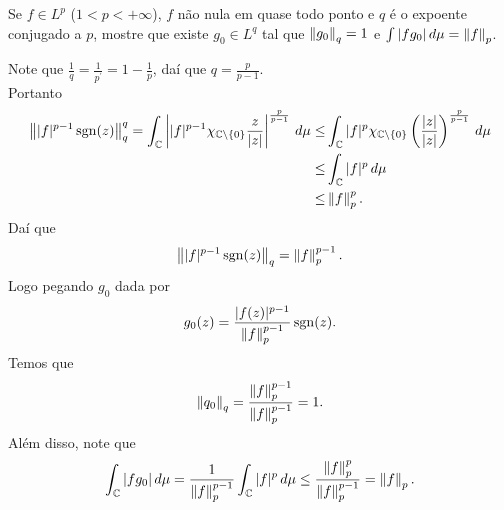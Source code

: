 \begin{homeworkProblem}[3]
  Se $f\in L^{p}$ ($1<p<+\infty$), $f$ não nula em quase todo ponto e $q$ é o expoente conjugado a $p$, mostre que existe $g_0\in L^{q}$ tal que $\left\|g_0\right\|_{q}=1$ e $\int |fg_0|\,d\mu=\left\|f\right\|_{p}$. 
  \begin{solution}
    Note que $\frac{1}{q}=\frac{1}{p^{\prime}}=1-\frac{1}{p}$, daí que $q=\frac{p}{p-1}$.\\
    Portanto
    \begin{align*}
      \left\||f|^{p-1}\operatorname*{sgn}(z)\right\|_{q}^{q}=\int_{\mathbb{C}}\left| |f|^{p-1}\chi_{\mathbb{C}\setminus\{0\}}\frac{z}{|z|} \right|^{\frac{p}{p-1}}\,d\mu\leq& \int_{\mathbb{C}}|f|^{p}\chi_{\mathbb{C}\setminus\{0\}}\left( \frac{|z|}{|z|} \right)^{\frac{p}{p-1}}\,d\mu\\
      \leq& \int_{\mathbb{C}}|f|^{p}\,d\mu\\
      \leq& \left\|f\right\|_{p}^{p}.
    \end{align*}
    Daí que
    \begin{align*}
      \left\||f|^{p-1}\operatorname*{sgn}(z)\right\|_{q}=\left\|f\right\|_p^{p-1}.
    \end{align*}
    Logo pegando $g_0$ dada por
    \begin{align*}
      g_0(z)=\frac{|f(z)|^{p-1}}{\left\|f\right\|_{p}^{p-1}}\operatorname*{sgn}(z).
    \end{align*}
    Temos que
    \begin{align*}
      \left\|q_0\right\|_q=\frac{\left\|f\right\|_{p}^{p-1}}{\left\|f\right\|_{p}^{p-1}}=1.
    \end{align*}
    Além disso, note que
    \begin{align*}
      \int_{\mathbb{C}}|fg_0|\,d\mu=\frac{1}{\left\|f\right\|_{p}^{p-1}}\int_{\mathbb{C}}|f|^{p}\,d\mu\leq \frac{\left\|f\right\|_{p}^{p}}{\left\|f\right\|_{p}^{p-1}}=\left\|f\right\|_{p}.
    \end{align*}
  \end{solution}
\end{homeworkProblem}
